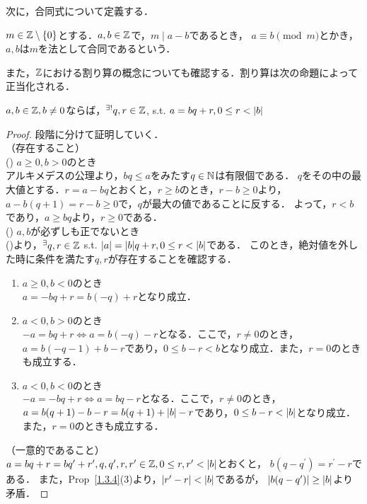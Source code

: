     次に，合同式について定義する．

    \begin{dfn} \label{1.4.12}
      $m \in \mathbb{Z} \setminus \lbrace0\rbrace$とする．$a, b \in \mathbb{Z}$で，$m \mid a-b$であるとき，
      $a \equiv b \pmod m$とかき，$a,b$は$m$を法として合同であるという．
    \end{dfn}

    また，$\mathbb{Z}$における割り算の概念についても確認する．割り算は次の命題によって正当化される．

    \begin{prop} \label{1.4.15}
      $a, b \in \mathbb{Z}, b \neq 0$ならば，$^{\exists !}q,r \in \mathbb{Z}$, s.t. $a=bq+r, 0 \leq r < \lvert b\rvert$
    \end{prop}

    \begin{proof}
      段階に分けて証明していく． \\
      （存在すること） \\
      () $a \geq 0, b > 0$のとき \\
      アルキメデスの公理より，$bq \leq a$をみたす$q \in \mathbb{N}$は有限個である．
      $q$をその中の最大値とする．$r = a-bq$とおくと，$r \geq b$のとき，$r-b \geq 0$より，
      $a-b(q+1) = r - b \geq 0$で，$q$が最大の値であることに反する．
      よって，$r < b$であり，$a \geq bq$より，$r \geq 0$である．\\
      () $a,b$が必ずしも正でないとき \\
      ()より，$^{\exists}q,r \in \mathbb{Z}$ s.t. $\lvert a\rvert = \lvert b\rvert q + r, 0 \leq r < \lvert b\rvert$である．
      このとき，絶対値を外した時に条件を満たす$q,r$が存在することを確認する．
      \begin{enumerate}
        \item $a \geq 0, b < 0$のとき\\
        $a = -bq + r = b(-q) + r$となり成立．
        \item $a < 0, b > 0$のとき\\
        $-a = bq + r \iff a = b(-q)-r$となる．ここで，$r \neq 0$のとき，
        $a = b(-q-1) + b-r$であり，$0 \leq b-r < b$となり成立．また，$r = 0$のときも成立する．
        \item $a < 0, b < 0のとき$\\
        $-a = -bq + r \iff a = bq - r$となる．ここで，$r \neq 0$のとき，
        $a = b(q+1)-b-r = b(q+1) + \lvert b\rvert - r$であり，$0 \leq b-r < \lvert b\rvert$となり成立．また，$r = 0$のときも成立する．
      \end{enumerate}
      （一意的であること）\\
      $a = bq + r = bq^{\prime}+r^{\prime}, q, q^{\prime}, r, r^{\prime} \in \mathbb{Z}, 0 \leq r, r^{\prime} < \lvert b\rvert$とおくと，
      $b(q-q^{\prime}) = r^{\prime} - r$である．
      また，Prop~\ref{1.3.4}(3)より，$\lvert r^{\prime} - r\rvert < \lvert b\rvert$であるが，
      $\lvert b(q-q^{\prime})\rvert \geq \lvert b\rvert$より矛盾．
    \end{proof}

